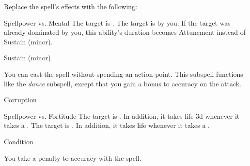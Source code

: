 Replace the spell's effects with the following:
\begin{spellcontent}
\begin{augmenteffects}
\begin{spellattack}{Spellpower vs. Mental}
\spellsuccess The target is .
\spellcritical
The target is  by you.
If the target was already dominated by you, this ability's duration becomes Attunement instead of Sustain (minor).
\end{spellattack}
\spelldur Sustain (minor)
\end{augmenteffects}
\end{spellcontent}
You can cast the spell without spending an action point.
This subspell functions like the \textit{dance} subspell, except that you gain a  bonus to accuracy on the attack.
\begin{spellsection}{Corruption}
\begin{spellheader}
\end{spellheader}
\begin{spellcontent}
\begin{spelltargetinginfo}
\end{spelltargetinginfo}
\begin{spelleffects}
\begin{spellattack}{Spellpower vs. Fortitude}
\spellsuccess
The target is .
In addition, it takes life  \minus3d whenever it takes a .
\spellcritical
The target is .
In addition, it takes life  whenever it takes a .
\end{spellattack}
\spelldur Condition
\end{spelleffects}
\end{spellcontent}
\begin{spellfooter}
\end{spellfooter}
\begin{spellsubcontent}
\begin{spellcantrip}
You take a  penalty to accuracy with the spell.
\end{spellcantrip}
\end{spellsubcontent}
\end{spellsection}
